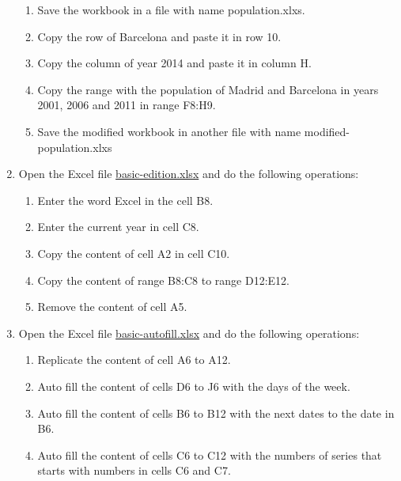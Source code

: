 \begin{enumerate}[leftmargin=*]
\begin{enumerate}
\item Save the workbook in a file with name \textsf{population.xlxs}.
\item Copy the row of Barcelona and paste it in row 10. 
\item Copy the column of year 2014 and paste it in column H. 
\item Copy the range with the population of Madrid and Barcelona in years 2001, 2006 and 2011 in range F8:H9. 
\item Save the modified workbook in another file with name \textsf{modified-population.xlxs}
\end{enumerate}


\item Open the Excel file
\href{http://aprendeconalf.es/office/excel/exercises/introduction/basic-edition.xlsx}{\textsf{basic-edition.xlsx}} and
do the following operations:
\begin{enumerate}
\item Enter the word Excel in the cell B8.
\item Enter the current year in cell C8.
\item Copy the content of cell A2 in cell C10.
\item Copy the content of range B8:C8 to range D12:E12.
\item Remove the content of cell A5.
\end{enumerate}

\item Open the Excel file
\href{http://aprendeconalf.es/office/excel/exercises/introduction/basic-autofill.xlsx}{\textsf{basic-autofill.xlsx}} and
do the following operations:
\begin{enumerate}
\item Replicate the content of cell  A6 to A12.
\item Auto fill the content of cells D6 to J6 with the days of the week.
\item Auto fill the content of cells B6 to B12 with the next dates to the date in B6.
\item Auto fill the content of cells C6 to C12 with the numbers of series that starts with numbers in cells  C6 and C7.
\end{enumerate}


\end{enumerate}
